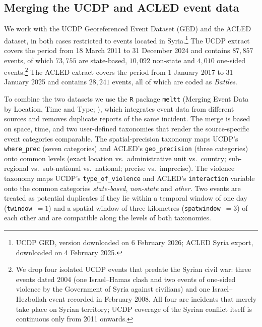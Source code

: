 \subsection{Merging the UCDP and ACLED event data}
\label{app:meltt}

We work with the UCDP Georeferenced Event Dataset (GED) and the ACLED
dataset, in both cases restricted to events located in Syria.\footnote{UCDP
GED, version downloaded on 6 February 2026; ACLED Syria export, downloaded on
4 February 2025.} The UCDP extract covers the period from 18 March 2011 to
31 December 2024 and contains $87{,}857$ events, of which $73{,}755$ are
state-based, $10{,}092$ non-state and $4{,}010$ one-sided events.\footnote{We
drop four isolated UCDP events that predate the Syrian civil war: three events
dated 2004 (one Israel--Hamas clash and two events of one-sided violence by the
Government of Syria against civilians) and one Israel--Hezbollah event recorded
in February 2008. All four are incidents that merely take place on Syrian
territory; UCDP coverage of the Syrian conflict itself is continuous only from
2011 onwards.} The ACLED extract covers the period from 1 January 2017 to
31 January 2025 and contains $28{,}241$
events, all of which are coded as \emph{Battles}.

To combine the two datasets we use the \texttt{R} package \texttt{meltt}
(Merging Event Data by Location, Time and Type; \citealp{Donnay2019}), which
integrates event data from different sources and removes duplicate reports of
the same incident. The merge is based on space, time, and two user-defined
taxonomies that render the source-specific event categories comparable. The
spatial-precision taxonomy maps UCDP's \texttt{where\_prec} (seven categories)
and ACLED's \texttt{geo\_precision} (three categories) onto common levels
(exact location vs.\ administrative unit vs.\ country; sub-regional vs.\
sub-national vs.\ national; precise vs.\ imprecise). The violence taxonomy maps
UCDP's \texttt{type\_of\_violence} and ACLED's \texttt{interaction} variable
onto the common categories \emph{state-based}, \emph{non-state} and
\emph{other}. Two events are treated as potential duplicates if they lie within
a temporal window of one day (\texttt{twindow}~$=1$) and a spatial window of
three kilometres (\texttt{spatwindow}~$=3$) of each other and are compatible
along the levels of both taxonomies.

